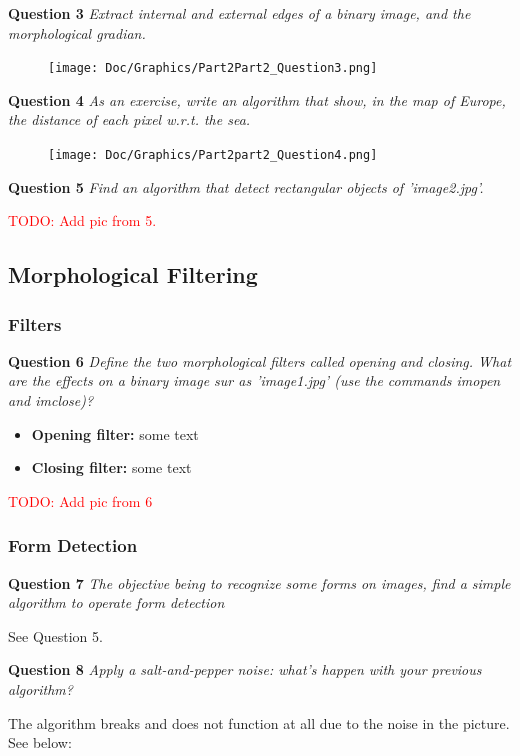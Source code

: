\newpage
\textbf{Question 3} \textit{Extract internal and external edges of a binary image, and the morphological gradian.}
\begin{figure}[h]
    \centering
    \texttt{[image: Doc/Graphics/Part2Part2\_Question3.png]}
\end{figure}


\textbf{Question 4} \textit{As an exercise, write an algorithm that show, in the map of Europe, the distance of each pixel w.r.t. the sea.}
\begin{figure}[h]
    \centering
    \texttt{[image: Doc/Graphics/Part2part2\_Question4.png]}
\end{figure}

\textbf{Question 5} \textit{Find an algorithm that detect rectangular objects of ’image2.jpg’.}

\textcolor{red}{TODO: Add pic from 5.}


\subsection{Morphological Filtering}
\subsubsection{Filters}
\textbf{Question 6} \textit{Deﬁne the two morphological ﬁlters called opening and closing. What are the eﬀects on a binary image sur as ’image1.jpg’ (use the commands imopen and imclose)?}

\begin{itemize}
    \item \textbf{Opening filter:}
    some text

    \item  \textbf{Closing filter:}
    some text
\end{itemize}

\textcolor{red}{TODO: Add pic from 6}


\subsubsection{Form Detection}
\textbf{Question 7} \textit{The objective being to recognize some forms on images, ﬁnd a simple algorithm to operate form detection}

See Question 5.


\textbf{Question 8} \textit{Apply a salt-and-pepper noise: what’s happen with your previous algorithm?}

The algorithm breaks and does not function at all due to the noise in the picture. See below:

